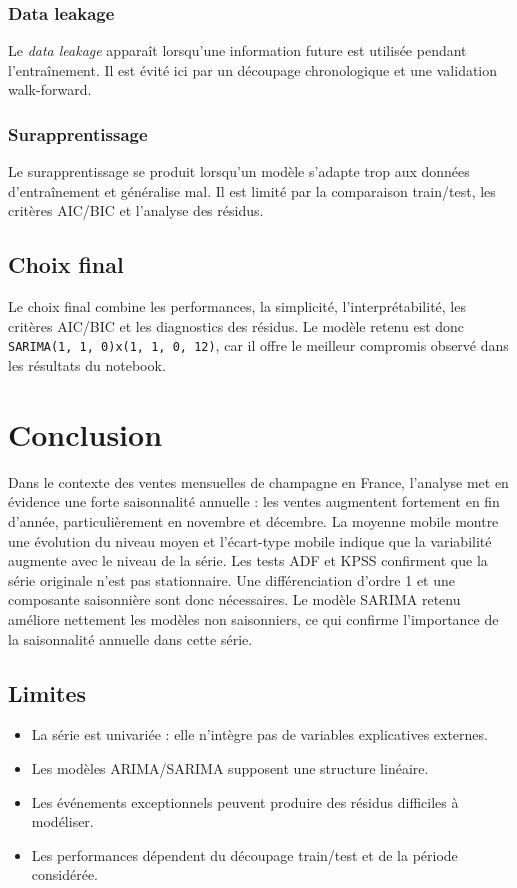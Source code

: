 \documentclass[12pt,a4paper]{report}
\begin{document}
\subsection{Data leakage}
Le \textit{data leakage} apparaît lorsqu'une information future est utilisée pendant l'entraînement. Il est évité ici par un découpage chronologique et une validation walk-forward.

\subsection{Surapprentissage}
Le surapprentissage se produit lorsqu'un modèle s'adapte trop aux données d'entraînement et généralise mal. Il est limité par la comparaison train/test, les critères AIC/BIC et l'analyse des résidus.

\section{Choix final}
Le choix final combine les performances, la simplicité, l'interprétabilité, les critères AIC/BIC et les diagnostics des résidus. Le modèle retenu est donc \texttt{SARIMA(1, 1, 0)x(1, 1, 0, 12)}, car il offre le meilleur compromis observé dans les résultats du notebook.

\chapter{Conclusion}
Dans le contexte des ventes mensuelles de champagne en France, l'analyse met en évidence une forte saisonnalité annuelle : les ventes augmentent fortement en fin d'année, particulièrement en novembre et décembre. La moyenne mobile montre une évolution du niveau moyen et l'écart-type mobile indique que la variabilité augmente avec le niveau de la série. Les tests ADF et KPSS confirment que la série originale n'est pas stationnaire. Une différenciation d'ordre 1 et une composante saisonnière sont donc nécessaires. Le modèle SARIMA retenu améliore nettement les modèles non saisonniers, ce qui confirme l'importance de la saisonnalité annuelle dans cette série.

\section{Limites}
\begin{itemize}
    \item La série est univariée : elle n'intègre pas de variables explicatives externes.
    \item Les modèles ARIMA/SARIMA supposent une structure linéaire.
    \item Les événements exceptionnels peuvent produire des résidus difficiles à modéliser.
    \item Les performances dépendent du découpage train/test et de la période considérée.
\end{itemize}
\end{document}
